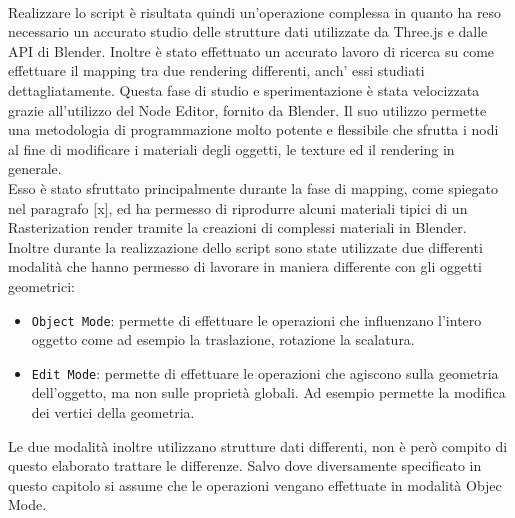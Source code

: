 \\
Realizzare lo script è risultata quindi un’operazione complessa in quanto ha reso necessario un accurato studio delle strutture dati utilizzate da Three.js e dalle API di Blender.
Inoltre è stato effettuato un accurato lavoro di ricerca su come effettuare il mapping tra due rendering differenti, anch’ essi studiati dettagliatamente.
Questa fase di studio e sperimentazione è stata velocizzata grazie all’utilizzo del Node Editor, fornito da Blender.
Il suo utilizzo permette una metodologia di programmazione molto potente e flessibile che sfrutta i nodi al fine di modificare i materiali degli oggetti, le texture ed il rendering in generale.
\\
Esso è stato sfruttato principalmente durante la fase di mapping, come spiegato nel paragrafo [x], ed ha permesso di riprodurre alcuni materiali tipici di un Rasterization render tramite la creazioni di complessi materiali in Blender.
\\
Inoltre durante la realizzazione dello script sono state utilizzate due differenti modalità che hanno permesso di lavorare in maniera differente con gli oggetti geometrici:
\begin{itemize}
\item \texttt{Object Mode}: permette di effettuare le operazioni che influenzano l’intero oggetto come ad esempio la traslazione, rotazione la scalatura.
\item \texttt{Edit Mode}: permette di effettuare le operazioni che agiscono sulla geometria dell’oggetto, ma non sulle proprietà globali. Ad esempio permette la modifica dei vertici della geometria.
\end{itemize}
Le due modalità inoltre utilizzano strutture dati differenti, non è però compito di questo elaborato trattare le differenze.
Salvo dove diversamente specificato in questo capitolo si assume che le operazioni vengano effettuate in modalità Objec Mode. 


